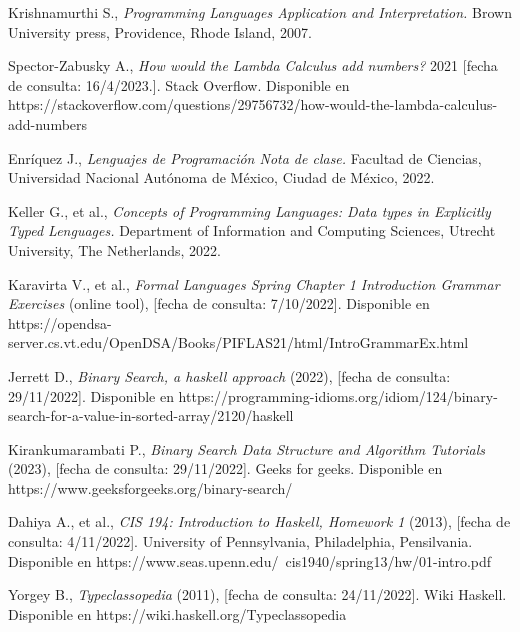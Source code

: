 \begin{thebibliography}{11}
    
    \label{sec:10}
    \hypertarget{10}{}
    Krishnamurthi S., \textit{Programming Languages Application and Interpretation.} Brown University press, Providence, Rhode Island, 2007.

    
    \label{sec:11}
    \hypertarget{11}{}
    Spector-Zabusky A., \textit{How would the Lambda Calculus add numbers?} 2021 [fecha de consulta: 16/4/2023.]. Stack Overflow. Disponible en https://stackoverflow.com/questions/29756732/how-would-the-lambda-calculus-add-numbers


    \label{sec:12}
    \hypertarget{12}{}
    Enríquez J., \textit{Lenguajes de Programación Nota de clase.} Facultad de Ciencias, Universidad Nacional Autónoma de México, Ciudad de México, 2022.

    
    \label{sec:13}
    \hypertarget{13}{}
    Keller G., et al., \textit{Concepts of Programming Languages: Data types in Explicitly Typed Lenguages.} Department of Information and Computing Sciences, Utrecht University, The Netherlands,  2022.


    \label{sec:14}
    \hypertarget{14}{}
    Karavirta V., et al., \textit{Formal Languages Spring Chapter 1 Introduction Grammar Exercises} (online tool),  [fecha de consulta: 7/10/2022]. Disponible en https://opendsa-server.cs.vt.edu/OpenDSA/Books/PIFLAS21/html/IntroGrammarEx.html

    \label{sec:15}
    \hypertarget{15}{}
    Jerrett D., \textit{Binary Search, a haskell approach} (2022), [fecha de consulta: 29/11/2022]. Disponible en https://programming-idioms.org/idiom/124/binary-search-for-a-value-in-sorted-array/2120/haskell

    \label{sec:16}
    \hypertarget{16}{}
    Kirankumarambati P., \textit{Binary Search Data Structure and Algorithm Tutorials} (2023), [fecha de consulta: 29/11/2022]. Geeks for geeks. Disponible en https://www.geeksforgeeks.org/binary-search/

    \label{sec:17}
    \hypertarget{17}{}
    Dahiya A., et al., \textit{CIS 194: Introduction to Haskell,  Homework 1} (2013), [fecha de consulta: 4/11/2022]. University of Pennsylvania, Philadelphia, Pensilvania. Disponible en https://www.seas.upenn.edu/~cis1940/spring13/hw/01-intro.pdf

    \label{sec:18}
    \hypertarget{18}{}
    Yorgey B., \textit{Typeclassopedia} (2011), [fecha de consulta: 24/11/2022]. Wiki Haskell. Disponible en https://wiki.haskell.org/Typeclassopedia


\end{thebibliography}
